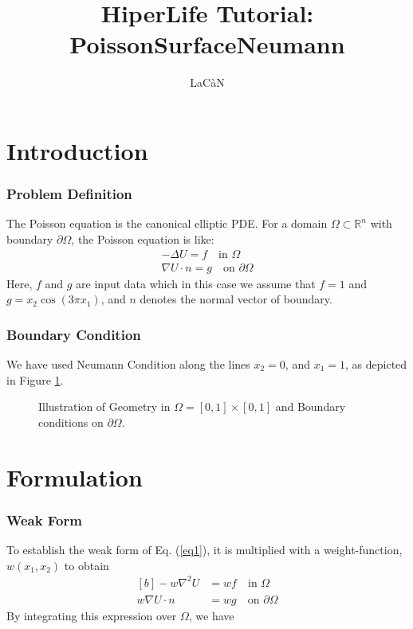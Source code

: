 \documentclass[]{article}
\begin{document}
\title{HiperLife Tutorial: PoissonSurfaceNeumann}
\author{LaCàN}
\maketitle

\linenumbers
\section{Introduction} \label{sec: Int}
\subsubsection{Problem Definition} \label{sec: pd} 
The Poisson equation is the canonical elliptic PDE. For a domain $\Omega \subset \mathbb{R}^n$ with boundary $\partial \Omega$, the Poisson equation is like:
\begin{equation}\label{eq1}
	\begin{aligned}
		 -\Delta U =f \quad  \text{in } \Omega \\
		 \nabla U \cdot n = g  \quad  \text{on }  \partial \Omega
	\end{aligned}
\end{equation}
Here, $f$ and $g$ are input data which in this case we assume that $f = 1$ and $g=x_{2}\cos{(3\pi x_{1})}$, and $n$ denotes the normal vector of boundary.
\subsubsection{Boundary Condition} \label{sec: B.C}
We have used Neumann Condition along the lines $x_{2}=0$, and $x_{1}=1$, as depicted in Figure \ref{fig_SB}.

\begin{figure}[htbp]
	\centering
	
	\caption{Illustration of Geometry in $\Omega =[0,1]\times[0,1]$ and Boundary conditions on $\partial \Omega$.}
	\label{fig_SB}
\end{figure}

\section{Formulation} \label{sec: frml}
\subsubsection{Weak Form} \label{sec: WF}
To establish the weak form of Eq. (\ref{eq1}), it is multiplied with a weight-function, $w(x_1, x_2)$ to obtain
\begin{equation}\label{eq2}
	\begin{aligned}[b]
		-w\nabla^2 U &= wf \quad  \text{in }  \Omega \\
		w\nabla U \cdot n &= wg  \quad  \text{on }  \partial \Omega
	\end{aligned}
\end{equation}
By integrating this expression over $\Omega$, we have
\end{document}
